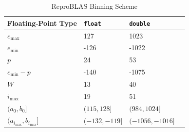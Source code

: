     \begin{table}[!htbp]
        \centering
        \begin{tabular}{ | l | l | l | p{5cm} |} \hline
            Floating-Point Type & \texttt{float} & \texttt{double}\\ \hline
            $e_{\max}$ & 127 & 1023\\ \hline
            $e_{\min}$ &  -126 & -1022 \\ \hline
            $p$ & 24 & 53 \\ \hline
            $e_{\min} - p$ & -140 & -1075 \\ \hline
            $W$ & 13 & 40 \\ \hline
            $i_{\max}$ & 19 & 51 \\ \hline
            $(a_0, b_0]$ & $(115, 128]$ & $(984, 1024]$\\ \hline
            $(a_{i_{\max}}, b_{i_{\max}}]$ & $(-132, -119]$ & $(-1056, -1016]$ \\ \hline
        \end{tabular}
        \caption{ReproBLAS Binning Scheme}
        \label{tbl:bins}
    \end{table}

